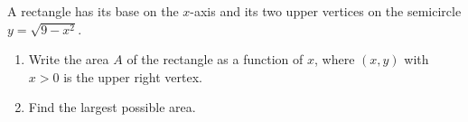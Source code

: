 A rectangle has its base on the $x$-axis and its two upper vertices on the semicircle $y=\sqrt{9-x^2}$.
\begin{enumerate}
\item[(a)] Write the area $A$ of the rectangle as a function of $x$, where $(x,y)$ with $x>0$ is the upper right vertex.
\item[(b)] Find the largest possible area.
\end{enumerate}
